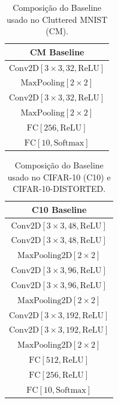 \documentclass[conference]{IEEEtran}
\begin{document}
\begin{table}[!ht]
  \begin{center}
    \begin{tabular}{|c|}
      \hline
      \textbf{CM Baseline}                       \\ \hline
      $\text{Conv2D}[3\times3, 32, \text{ReLU}]$ \\ \hline
      $\text{MaxPooling}[2\times2]$              \\ \hline
      $\text{Conv2D}[3\times3, 32, \text{ReLU}]$ \\ \hline
      $\text{MaxPooling}[2\times2]$              \\ \hline
      $\text{FC}[256, \text{ReLU}]$              \\ \hline
      $\text{FC}[10, \text{Softmax}]$            \\ \hline
    \end{tabular}
  \end{center}
  \caption{Composição do Baseline usado no Cluttered MNIST (CM).}
  \label{tab:cm-comp}
\end{table}

\begin{table}[!ht]
  \begin{center}
    \begin{tabular}{|c|}
      \hline
      \textbf{C10 Baseline}                       \\ \hline
      $\text{Conv2D}[3\times3, 48, \text{ReLU}]$  \\ \hline
      $\text{Conv2D}[3\times3, 48, \text{ReLU}]$  \\ \hline
      $\text{MaxPooling2D}[2\times2]$             \\ \hline
      $\text{Conv2D}[3\times3, 96, \text{ReLU}]$  \\ \hline
      $\text{Conv2D}[3\times3, 96, \text{ReLU}]$  \\ \hline
      $\text{MaxPooling2D}[2\times2]$             \\ \hline
      $\text{Conv2D}[3\times3, 192, \text{ReLU}]$ \\ \hline
      $\text{Conv2D}[3\times3, 192, \text{ReLU}]$ \\ \hline
      $\text{MaxPooling2D}[2\times2]$             \\ \hline
      $\text{FC}[512, \text{ReLU}]$               \\ \hline
      $\text{FC}[256, \text{ReLU}]$               \\ \hline
      $\text{FC}[10, \text{Softmax}]$             \\ \hline
    \end{tabular}
  \end{center}
  \caption{Composição do Baseline usado no CIFAR-10 (C10) e CIFAR-10-DISTORTED.}
  \label{tab:c10-comp}
\end{table}
\end{document}
